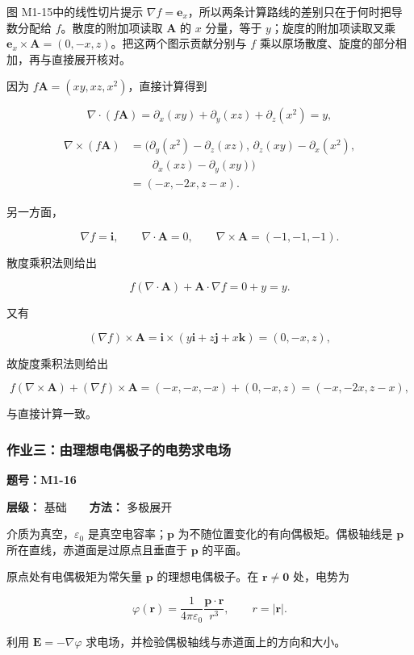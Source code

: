 图 M1-15中的线性切片提示
\(\nabla f=\mathbf e_x\)，所以两条计算路线的差别只在于何时把导数分配给
\(f\)。散度的附加项读取 \(\mathbf A\) 的 \(x\) 分量，等于
\(y\)；旋度的附加项读取叉乘
\(\mathbf e_x\times\mathbf A=(0,-x,z)\)。把这两个图示贡献分别与 \(f\)
乘以原场散度、旋度的部分相加，再与直接展开核对。

因为 \(f\mathbf A=(xy,xz,x^2)\)，直接计算得到

\[
\nabla\cdot(f\mathbf A)
=\partial_x(xy)+\partial_y(xz)+\partial_z(x^2)=y,
\]

\[
\begin{aligned}
\nabla\times(f\mathbf A)
&=\bigl(\partial_y(x^2)-\partial_z(xz),\,
\partial_z(xy)-\partial_x(x^2),\\
&\qquad \partial_x(xz)-\partial_y(xy)\bigr)\\
&=(-x,-2x,z-x).
\end{aligned}
\]

另一方面，

\[
\nabla f=\mathbf i,\qquad
\nabla\cdot\mathbf A=0,\qquad
\nabla\times\mathbf A=(-1,-1,-1).
\]

散度乘积法则给出

\[
f(\nabla\cdot\mathbf A)+\mathbf A\cdot\nabla f
=0+y=y.
\]

又有

\[
(\nabla f)\times\mathbf A
=\mathbf i\times(y\mathbf i+z\mathbf j+x\mathbf k)
=(0,-x,z),
\]

故旋度乘积法则给出

\[
f(\nabla\times\mathbf A)+(\nabla f)\times\mathbf A
=(-x,-x,-x)+(0,-x,z)
=(-x,-2x,z-x),
\]

与直接计算一致。

\par{}
\noindent\begin{minipage}{\linewidth}

\subsubsection{作业三：由理想电偶极子的电势求电场}\label{m1:ux4f5cux4e1aux4e09ux7531ux7406ux60f3ux7535ux5076ux6781ux5b50ux7684ux7535ux52bfux6c42ux7535ux573a}

\textbf{题号：M1-16}

\textbf{层级：} 基础　　\textbf{方法：} 多极展开

介质为真空，\(\varepsilon_0\) 是真空电容率；\(\mathbf p\)
为不随位置变化的有向偶极矩。偶极轴线是 \(\mathbf p\)
所在直线，赤道面是过原点且垂直于 \(\mathbf p\) 的平面。

原点处有电偶极矩为常矢量 \(\mathbf p\) 的理想电偶极子。在
\(\mathbf r\ne\mathbf0\) 处，电势为

\[
\varphi(\mathbf r)
=\frac{1}{4\pi\varepsilon_0}
\frac{\mathbf p\cdot\mathbf r}{r^3},
\qquad r=|\mathbf r|.
\]

利用 \(\mathbf E=-\nabla\varphi\)
求电场，并检验偶极轴线与赤道面上的方向和大小。


\end{minipage}\par

